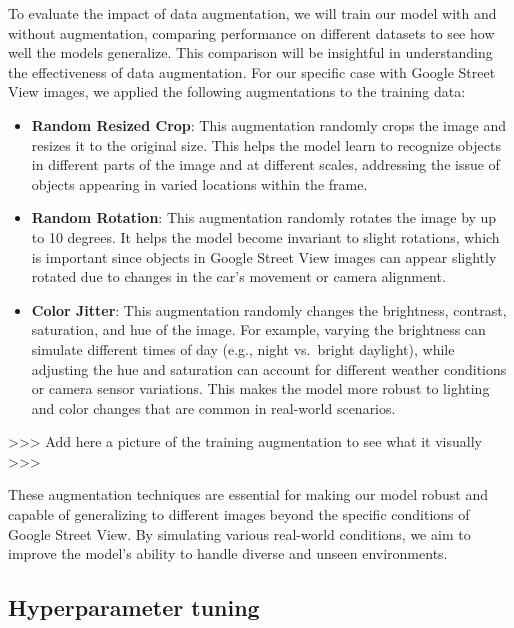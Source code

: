 To evaluate the impact of data augmentation, we will train our model
with and without augmentation, comparing performance on different
datasets to see how well the models generalize. This comparison will be
insightful in understanding the effectiveness of data augmentation. For
our specific case with Google Street View images, we applied the
following augmentations to the training data:

\begin{itemize}
\tightlist
\item
  \textbf{Random Resized Crop}: This augmentation randomly crops the
  image and resizes it to the original size. This helps the model learn
  to recognize objects in different parts of the image and at different
  scales, addressing the issue of objects appearing in varied locations
  within the frame.
\item
  \textbf{Random Rotation}: This augmentation randomly rotates the image
  by up to 10 degrees. It helps the model become invariant to slight
  rotations, which is important since objects in Google Street View
  images can appear slightly rotated due to changes in the car's
  movement or camera alignment.
\item
  \textbf{Color Jitter}: This augmentation randomly changes the
  brightness, contrast, saturation, and hue of the image. For example,
  varying the brightness can simulate different times of day (e.g.,
  night vs.~bright daylight), while adjusting the hue and saturation can
  account for different weather conditions or camera sensor variations.
  This makes the model more robust to lighting and color changes that
  are common in real-world scenarios.
\end{itemize}

\textgreater\textgreater\textgreater{} Add here a picture of the
training augmentation to see what it visually
\textgreater\textgreater\textgreater{}

These augmentation techniques are essential for making our model robust
and capable of generalizing to different images beyond the specific
conditions of Google Street View. By simulating various real-world
conditions, we aim to improve the model's ability to handle diverse and
unseen environments.

\subsection{Hyperparameter tuning}\label{hyperparameter-tuning}

